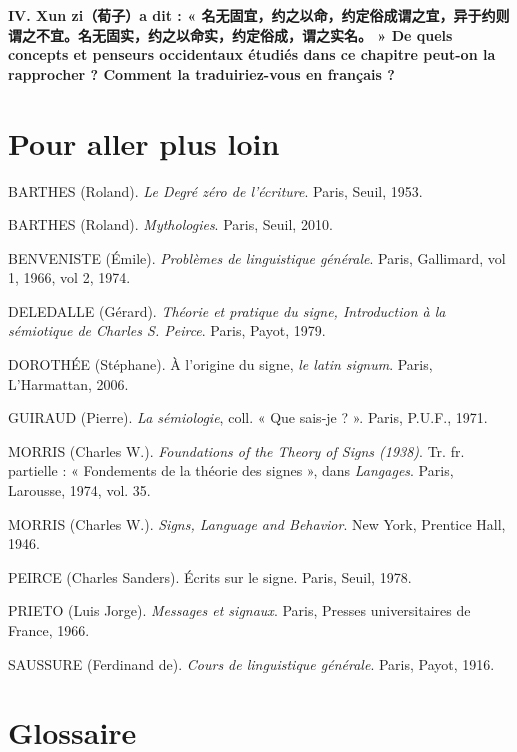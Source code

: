 \noindent\textbf{IV. Xun zi（荀子）a dit : « 名无固宜，约之以命，约定俗成谓之宜，异于约则谓之不宜。名无固实，约之以命实，约定俗成，谓之实名。 » De quels concepts et penseurs occidentaux étudiés dans ce chapitre peut-on la rapprocher ? Comment la traduiriez-vous en français ?}

\section*{Pour aller plus loin}
\begin{small}
\setlength{\parindent}{0pt}\setlength{\parskip}{.55em}
BARTHES (Roland). \textit{Le Degré zéro de l’écriture}. Paris, Seuil, 1953.

BARTHES (Roland). \textit{Mythologies}. Paris, Seuil, 2010.

BENVENISTE (Émile). \textit{Problèmes de linguistique générale}. Paris, Gallimard, vol 1, 1966, vol 2, 1974.

DELEDALLE (Gérard). \textit{Théorie et pratique du signe, Introduction à la sémiotique de Charles S. Peirce}. Paris, Payot, 1979.

DOROTHÉE (Stéphane). À l’origine du signe, \textit{le latin signum}. Paris, L’Harmattan, 2006.

GUIRAUD (Pierre). \textit{La sémiologie}, coll. « Que sais-je ? ». Paris, P.U.F., 1971.

MORRIS (Charles W.). \textit{Foundations of the Theory of Signs (1938)}. Tr. fr. partielle : « Fondements de la théorie des signes », dans \textit{Langages}. Paris, Larousse, 1974, vol. 35.

MORRIS (Charles W.). \textit{Signs, Language and Behavior}. New York, Prentice Hall, 1946.

PEIRCE (Charles Sanders). Écrits sur le signe. Paris, Seuil, 1978.

PRIETO (Luis Jorge). \textit{Messages et signaux}. Paris, Presses universitaires de France, 1966.

SAUSSURE (Ferdinand de). \textit{Cours de linguistique générale}. Paris, Payot, 1916.
\end{small}

\begingroup{}\setlength{\parskip}{.18em}
\section*{Glossaire}


